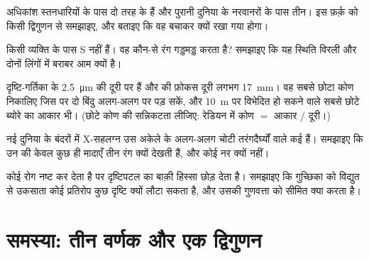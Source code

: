 \begin{exercise}[$\star\star$]\label{exo:g11:the-eye:11}
अधिकांश स्तनधारियों के पास दो तरह के  हैं और पुरानी दुनिया के नरवानरों
के पास तीन। इस फ़र्क़ को किसी द्विगुणन से समझाइए, और बताइए कि वह बचाकर क्यों
रखा गया होगा।
\end{exercise}

\begin{exercise}[$\star\star\star$]\label{exo:g11:the-eye:12}
किसी व्यक्ति के पास S  नहीं हैं। वह कौन-से रंग गड्डमड्ड करता है?
समझाइए कि यह स्थिति विरली और दोनों लिंगों में बराबर आम क्यों है।
\end{exercise}

\begin{exercise}[$\star\star\star$]\label{exo:g11:the-eye:13}
दृष्टि-गर्तिका के  \qty{2.5}{\micro m} की दूरी पर हैं और  की फ़ोकस
दूरी लगभग \qty{17}{mm}। वह सबसे छोटा कोण निकालिए जिस पर दो बिंदु अलग-अलग
 पर पड़ सकें, और \qty{10}{m} पर विभेदित हो सकने वाले सबसे छोटे ब्योरे
का आकार भी। (छोटे कोण की सन्निकटता लीजिए: रेडियन में कोण $=$ आकार $/$
दूरी।)
\end{exercise}

\begin{exercise}[$\star\star\star$]\label{exo:g11:the-eye:14}
नई दुनिया के बंदरों में X-सहलग्न उस अकेले   के अलग-अलग चोटी
तरंगदैर्घ्यों वाले कई  हैं। समझाइए कि उन  की केवल कुछ ही
मादाएँ तीन रंग क्यों देखती हैं, और कोई नर क्यों नहीं।
\end{exercise}

\begin{exercise}[$\star\star\star$]\label{exo:g11:the-eye:15}
कोई रोग  नष्ट कर देता है पर दृष्टिपटल का बाक़ी हिस्सा छोड़ देता
है। समझाइए कि गुच्छिका  को विद्युत से उकसाता कोई प्रतिरोप कुछ
दृष्टि क्यों लौटा सकता है, और उसकी गुणवत्ता को सीमित क्या करता है।
\end{exercise}

\section{समस्या: तीन वर्णक और एक द्विगुणन}

